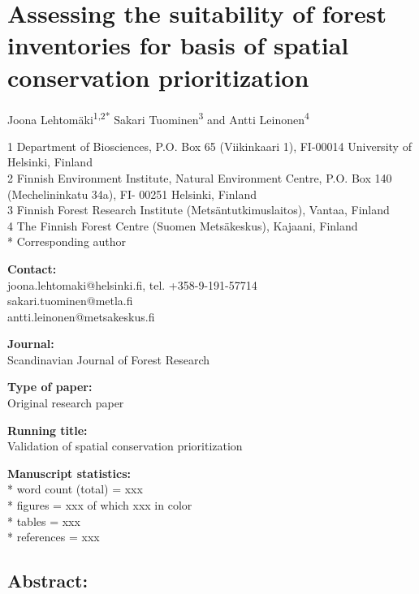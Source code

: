 \documentclass[]{article}
\begin{document}
\section{Assessing the suitability of forest inventories for basis of
spatial conservation prioritization}

Joona Lehtomäki\textsuperscript{1,2*} Sakari Tuominen\textsuperscript{3}
and Antti Leinonen\textsuperscript{4}

1 Department of Biosciences, P.O. Box 65 (Viikinkaari 1), FI-00014
University of Helsinki, Finland\\2 Finnish Environment Institute,
Natural Environment Centre, P.O. Box 140 (Mechelininkatu 34a), FI- 00251
Helsinki, Finland\\3 Finnish Forest Research Institute
(Metsäntutkimuslaitos), Vantaa, Finland\\4 The Finnish Forest Centre
(Suomen Metsäkeskus), Kajaani, Finland\\* Corresponding author

\textbf{Contact:}\\joona.lehtomaki@helsinki.fi, tel.
+358-9-191-57714\\sakari.tuominen@metla.fi\\antti.leinonen@metsakeskus.fi

\textbf{Journal:}\\Scandinavian Journal of Forest Research

\textbf{Type of paper:}\\Original research paper

\textbf{Running title:}\\Validation of spatial conservation
prioritization

\textbf{Manuscript statistics:}\\* word count (total) = xxx\\* figures =
xxx of which xxx in color\\* tables = xxx\\* references = xxx

\subsection{Abstract:}
\end{document}
